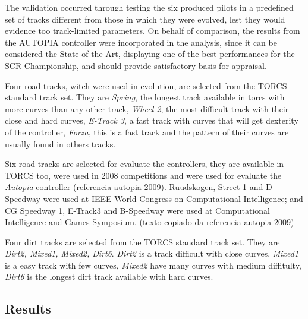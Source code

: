 	
	The validation occurred through testing the six produced pilots in a predefined set of tracks different from those
	in which they were evolved, lest they would evidence too track-limited parameters. On behalf of comparison, the
	results from the AUTOPIA controller were incorporated in the analysis, since it can be considered the State of
	the Art, displaying one of the best performances for the SCR Championship, and should provide satisfactory basis
	for appraisal.

	Four road tracks, witch were used in evolution, are selected from the TORCS standard track set. They are \emph{Spring}, 
	the longest track available in torcs with more curves than any other track, \emph{Wheel 2}, the most difficult track 
	with their close and hard curves, \emph{E-Track 3}, a fast track with curves that will get dexterity of the controller, 
	\emph{Forza}, this is a fast track and the pattern of their curves are usually found in others tracks.

	Six road tracks are selected for evaluate the controllers, they are available in TORCS too, were used in 2008 competitions 
	and were used for evaluate the \emph{Autopia} controller (referencia autopia-2009). Ruudskogen, Street-1 and D-Speedway were 
	used at IEEE World Congress on Computational Intelligence; and CG Speedway 1, E-Track3 and B-Speedway were used 
	at Computational Intelligence and Games Symposium. (texto copiado da referencia autopia-2009)

	Four dirt tracks are selected from the TORCS standard track set. They are \emph{Dirt2, Mixed1, Mixed2, Dirt6}. 
	\emph{Dirt2} is a track difficult with close curves, \emph{Mixed1} is a easy track with few curves, \emph{Mixed2} have many 
	curves with medium diffitulty, \emph{Dirt6} is the longest dirt track available with hard curves.
	
\subsection{Results} \label{subsec:Results}
	
	
